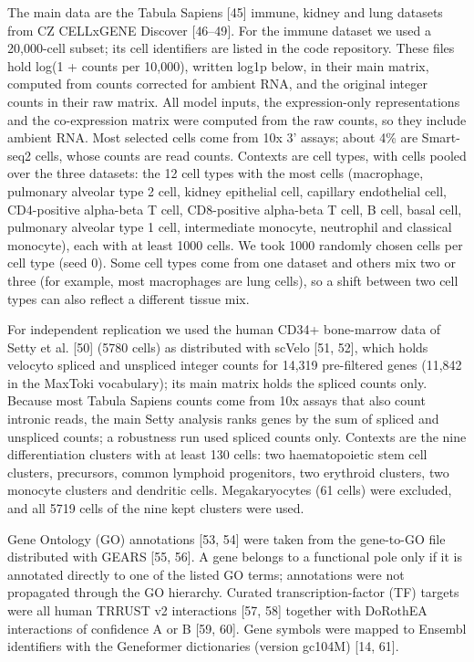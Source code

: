\documentclass[
  11pt,
]{article}
\begin{document}
The main data are the Tabula Sapiens {[}45{]} immune, kidney and lung
datasets from CZ CELLxGENE Discover {[}46--49{]}. For the immune dataset
we used a 20,000-cell subset; its cell identifiers are listed in the
code repository. These files hold log(1 + counts per 10,000), written
log1p below, in their main matrix, computed from counts corrected for
ambient RNA, and the original integer counts in their raw matrix. All
model inputs, the expression-only representations and the co-expression
matrix were computed from the raw counts, so they include ambient RNA.
Most selected cells come from 10x 3' assays; about 4\% are Smart-seq2
cells, whose counts are read counts. Contexts are cell types, with cells
pooled over the three datasets: the 12 cell types with the most cells
(macrophage, pulmonary alveolar type 2 cell, kidney epithelial cell,
capillary endothelial cell, CD4-positive alpha-beta T cell, CD8-positive
alpha-beta T cell, B cell, basal cell, pulmonary alveolar type 1 cell,
intermediate monocyte, neutrophil and classical monocyte), each with at
least 1000 cells. We took 1000 randomly chosen cells per cell type (seed
0). Some cell types come from one dataset and others mix two or three
(for example, most macrophages are lung cells), so a shift between two
cell types can also reflect a different tissue mix.

For independent replication we used the human CD34+ bone-marrow data of
Setty et al. {[}50{]} (5780 cells) as distributed with scVelo {[}51,
52{]}, which holds velocyto spliced and unspliced integer counts for
14,319 pre-filtered genes (11,842 in the MaxToki vocabulary); its main
matrix holds the spliced counts only. Because most Tabula Sapiens counts
come from 10x assays that also count intronic reads, the main Setty
analysis ranks genes by the sum of spliced and unspliced counts; a
robustness run used spliced counts only. Contexts are the nine
differentiation clusters with at least 130 cells: two haematopoietic
stem cell clusters, precursors, common lymphoid progenitors, two
erythroid clusters, two monocyte clusters and dendritic cells.
Megakaryocytes (61 cells) were excluded, and all 5719 cells of the nine
kept clusters were used.

Gene Ontology (GO) annotations {[}53, 54{]} were taken from the
gene-to-GO file distributed with GEARS {[}55, 56{]}. A gene belongs to a
functional pole only if it is annotated directly to one of the listed GO
terms; annotations were not propagated through the GO hierarchy. Curated
transcription-factor (TF) targets were all human TRRUST v2 interactions
{[}57, 58{]} together with DoRothEA interactions of confidence A or B
{[}59, 60{]}. Gene symbols were mapped to Ensembl identifiers with the
Geneformer dictionaries (version gc104M) {[}14, 61{]}.
\end{document}
